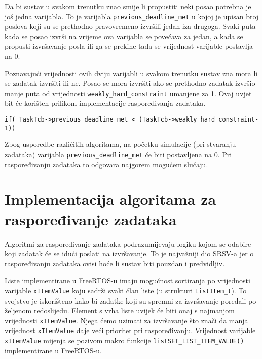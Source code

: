 \documentclass[../zavrsni.tex]{subfiles}
\begin{document}
Da bi sustav u svakom trenutku znao smije li propustiti neki posao potrebna je još jedna varijabla. To je varijabla 
\texttt{previous\_deadline\_met} u kojoj je upisan broj poslova koji su se prethodno pravovremeno izvršili jedan iza drugoga.
Svaki puta kada se posao izvrši na vrijeme ova varijabla se povećava za jedan, a kada se propusti izvršavanje posla ili ga se prekine tada 
se vrijednost varijable postavlja na 0.

Poznavajući vrijednosti ovih dviju varijabli u svakom trenutku sustav zna mora li se zadatak izvršiti ili ne. Posao se mora izvršiti
ako se prethodno zadatak izvršio manje puta od vrijednosti \texttt{weakly\_hard\_constraint} umanjene za 1. Ovaj uvjet bit će 
korišten prilikom implementacije raspoređivanja zadataka.

\begin{lstlisting}[style=CStyle,caption={Uvjet za slučaj kada se zadatak mora izvršiti},captionpos=b]
if( TaskTcb->previous_deadline_met < (TaskTcb->weakly_hard_constraint-1))
\end{lstlisting}

Zbog usporedbe različitih algoritama, na početku simulacije (pri stvaranju zadataka) varijabla \texttt{previous\_deadline\_met} će 
biti postavljena na 0. Pri raspoređivanju zadataka to odgovara najgorem mogućem slučaju.

\section{Implementacija algoritama za raspoređivanje zadataka}

Algoritmi za raspoređivanje zadataka podrazumijevaju logiku kojom se odabire koji zadatak će se idući poslati na izvršavanje.
To je najvažniji dio SRSV-a jer o raspoređivanju zadataka ovisi hoće li sustav biti pouzdan i predvidljiv.

Liste implementirane u FreeRTOS-u imaju mogućnost sortiranja po vrijednosti varijable \texttt{xItemValue} koju sadrži svaki član liste 
(u strukturi \texttt{ListItem\_t}). To svojstvo je iskorišteno kako bi zadatke koji su spremni za izvršavanje poredali po željenom 
redoslijedu. Element s vrha liste uvijek će biti onaj s najmanjom vrijednosti \texttt{xItemValue}. Njega ćemo uzimati za izvršavanje 
 što znači da manja vrijednost \texttt{xItemValue} daje veći prioritet pri raspoređivanju.
Vrijednost varijable \texttt{xItemValue} mijenja se pozivom makro funkcije \texttt{listSET\_LIST\_ITEM\_VALUE()} 
implementirane u FreeRTOS-u.
\end{document}
